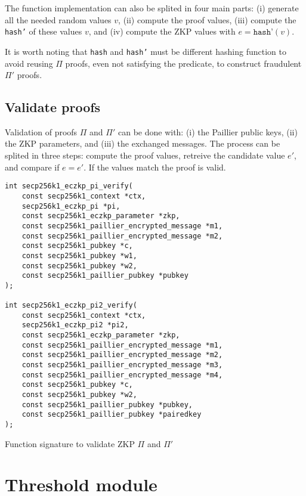 The function implementation can also be splited in four main parts: (i) generate all
the needed random values $v$, (ii) compute the proof values, (iii) compute the \texttt{hash'}
of these values $v$, and (iv) compute the ZKP values with $e = \texttt{hash'}(v)$.

It is worth noting that \texttt{hash} and \texttt{hash'} must be different hashing
function to avoid reusing $\Pi$ proofs, even not satisfying the predicate, to construct
fraudulent $\Pi'$ proofs.

\subsection{Validate proofs}

Validation of proofs $\Pi$ and $\Pi'$ can be done with: (i) the Paillier public keys,
(ii) the ZKP parameters, and (iii) the exchanged messages. The process can be splited
in three steps: compute the proof values, retreive the candidate value $e'$, and
compare if $e = e'$. If the values match the proof is valid.

\begin{listing}
  \begin{verbatim}
int secp256k1_eczkp_pi_verify(
    const secp256k1_context *ctx,
    secp256k1_eczkp_pi *pi,
    const secp256k1_eczkp_parameter *zkp,
    const secp256k1_paillier_encrypted_message *m1,
    const secp256k1_paillier_encrypted_message *m2,
    const secp256k1_pubkey *c,
    const secp256k1_pubkey *w1,
    const secp256k1_pubkey *w2,
    const secp256k1_paillier_pubkey *pubkey
);

int secp256k1_eczkp_pi2_verify(
    const secp256k1_context *ctx,
    secp256k1_eczkp_pi2 *pi2,
    const secp256k1_eczkp_parameter *zkp,
    const secp256k1_paillier_encrypted_message *m1,
    const secp256k1_paillier_encrypted_message *m2,
    const secp256k1_paillier_encrypted_message *m3,
    const secp256k1_paillier_encrypted_message *m4,
    const secp256k1_pubkey *c,
    const secp256k1_pubkey *w2,
    const secp256k1_paillier_pubkey *pubkey,
    const secp256k1_paillier_pubkey *pairedkey
);
  \end{verbatim}
	\caption{Function signature to validate ZKP $\Pi$ and $\Pi'$}
	\label{lst:funcSigValidatePiPi2}
\end{listing}


\section{Threshold module}
\lipsum[1-2]
